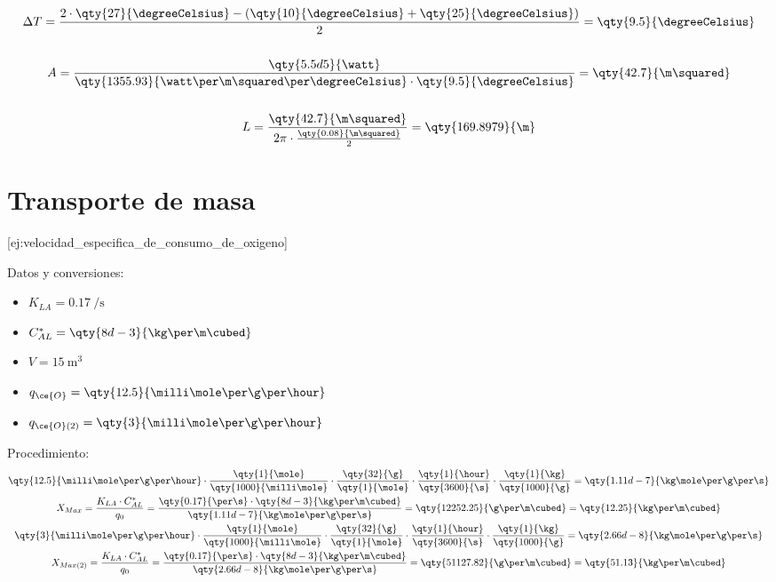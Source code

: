 {\begin{gather*}
        \\\\
        \Delta T = \frac{2 \cdot \qty{27}{\degreeCelsius} - (\qty{10}{\degreeCelsius} + \qty{25}{\degreeCelsius})}{2} = \qty{9.5}{\degreeCelsius}
        \\\\
        A = \frac{\qty{5.5d5}{\watt}}{\qty{1355.93}{\watt\per\m\squared\per\degreeCelsius} \cdot \qty{9.5}{\degreeCelsius}} = \qty{42.7}{\m\squared} 
        \\\\
        L = \frac{\qty{42.7}{\m\squared}}{2\pi \cdot \frac{\qty{0.08}{\m\squared}}{2}} = \qty{169.8979}{\m} 
    \end{gather*}
}




    \section{Transporte de masa}


[ej:velocidad_especifica_de_consumo_de_oxigeno]{
    Datos y conversiones:
    \begin{itemize}
        \item $K_{LA} = \qty{0.17}{\per\s}$
        \item $C_{AL}^{\ast} = \qty{8d-3}{\kg\per\m\cubed}$
        \item $V = \qty{15}{\m\cubed}$
        \item $q_{\ce{O}} = \qty{12.5}{\milli\mole\per\g\per\hour}$
        \item $q_{\ce{O}(2)} = \qty{3}{\milli\mole\per\g\per\hour}$
    \end{itemize}
    Procedimiento:
    \begin{gather*}
        \qty{12.5}{\milli\mole\per\g\per\hour} \cdot \frac{\qty{1}{\mole}}{\qty{1000}{\milli\mole}} \cdot \frac{\qty{32}{\g}}{\qty{1}{\mole}} \cdot \frac{\qty{1}{\hour}}{\qty{3600}{\s}} \cdot \frac{\qty{1}{\kg}}{\qty{1000}{\g}} = \qty{1.11d-7}{\kg\mole\per\g\per\s}
        \\
        X_{Max} = \frac{K_{LA} \cdot C_{AL}^{\ast}}{q_{0}} = \frac{\qty{0.17}{\per\s} \cdot \qty{8d-3}{\kg\per\m\cubed}}{\qty{1.11d-7}{\kg\mole\per\g\per\s}} = \qty{12252.25}{\g\per\m\cubed} = \qty{12.25}{\kg\per\m\cubed}
        \\
        \qty{3}{\milli\mole\per\g\per\hour} \cdot \frac{\qty{1}{\mole}}{\qty{1000}{\milli\mole}} \cdot \frac{\qty{32}{\g}}{\qty{1}{\mole}} \cdot \frac{\qty{1}{\hour}}{\qty{3600}{\s}} \cdot \frac{\qty{1}{\kg}}{\qty{1000}{\g}} = \qty{2.66d-8}{\kg\mole\per\g\per\s}
        \\
        X_{Max(2)} = \frac{K_{LA} \cdot C_{AL}^{\ast}}{q_{0}} = \frac{\qty{0.17}{\per\s} \cdot \qty{8d-3}{\kg\per\m\cubed}}{\qty{2.66d-8}{\kg\mole\per\g\per\s}} = \qty{51127.82}{\g\per\m\cubed} = \qty{51.13}{\kg\per\m\cubed}
    \end{gather*}
}

